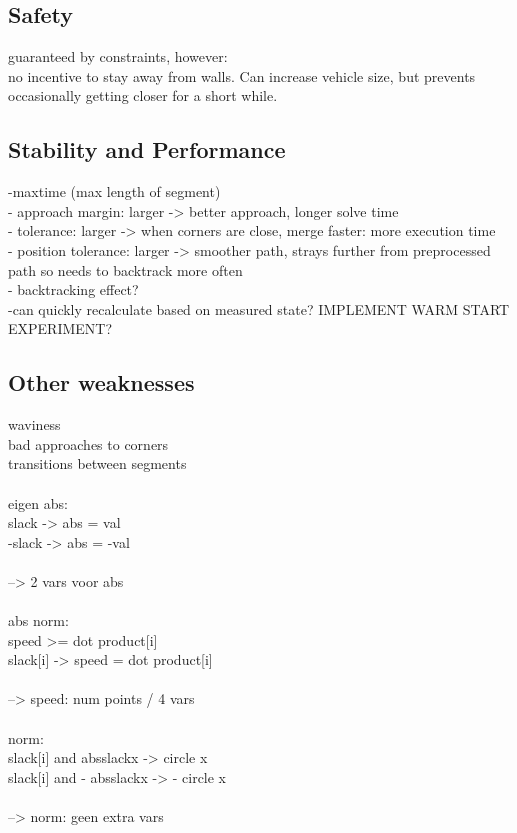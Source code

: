 \subsection{Safety}
guaranteed by constraints, however:\\
no incentive to stay away from walls. Can increase vehicle size, but prevents occasionally getting closer for a short while.\\
\subsection{Stability and Performance}
-maxtime (max length of segment)\\
- approach margin: larger -> better approach, longer solve time\\
- tolerance: larger -> when corners are close, merge faster: more execution time\\
- position tolerance: larger -> smoother path, strays further from preprocessed path so needs to backtrack more often\\
- backtracking effect?\\
-can quickly recalculate based on measured state? IMPLEMENT WARM START EXPERIMENT?\\
\subsection{Other weaknesses}
waviness\\
bad approaches to corners\\
transitions between segments\\\\

eigen abs:\\
slack -> abs = val\\
-slack -> abs = -val\\\\

--> 2 vars voor abs\\\\

abs norm:\\
speed >= dot product[i]\\
slack[i] -> speed = dot product[i]\\\\

--> speed: num points / 4 vars\\\\

norm:\\
slack[i] and absslackx -> circle x\\
slack[i] and - absslackx -> - circle x\\\\

--> norm: geen extra vars   \\